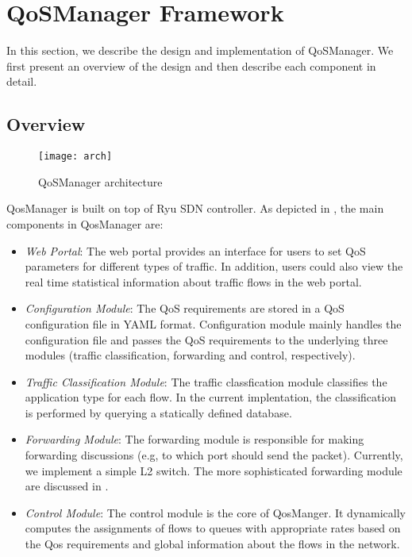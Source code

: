 \section{QoSManager Framework}
\label{sect:qosmanager}
In this section, we describe the design and implementation of QoSManager. We first present
an overview of the design and then describe each component in detail.

\subsection{Overview}

\begin{figure}[htb]
\centering
\texttt{[image: arch]}
\caption{QoSManager architecture}
\label{fig:architecture}
\end{figure}

QosManager is built on top of Ryu SDN controller. As depicted in , the main
components in QosManager are: 

\begin{itemize}
  \item \emph{Web Portal}: The web portal provides an interface for users to set QoS parameters for
    different types of traffic. In addition, users could also view the real time statistical
    information about traffic flows in the web portal.
  \item \emph{Configuration Module}: The QoS requirements are stored in a QoS configuration file in YAML
    format. Configuration module mainly handles the configuration file and passes the QoS requirements
    to the underlying three modules (traffic classification, forwarding and control, respectively).
  \item \emph{Traffic Classification Module}: The traffic classfication module classifies the application
    type for each flow. In the current implentation, the classification is performed by querying a statically
    defined database.
  \item \emph{Forwarding Module}: The forwarding module is responsible for making forwarding discussions (e.g,
    to which port should send the packet). Currently, we implement a simple L2 switch. The more sophisticated
    forwarding module are discussed in .
  \item \emph{Control Module}: The control module is the core of QosManger. It dynamically computes the
    assignments of flows to queues with appropriate rates based on the Qos requirements and global information
    about the flows in the network.


\end{itemize}


